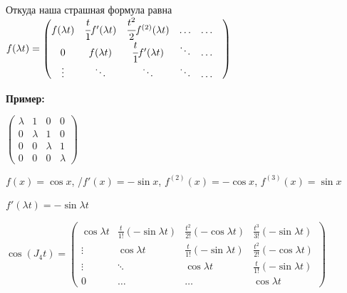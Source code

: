 Откуда наша страшная формула равна $f(\lambda t) = \begin{pmatrix}
    f(\lambda t) & \cfrac{t}{1}f'(\lambda t) & \cfrac{t^2}{2}f^{(2)}(\lambda t) & \ldots & \ldots & \\
    0 & f(\lambda t) & \cfrac{t}{1}f'(\lambda t) &\ddots &\ldots 
    \\
    \vdots & \ddots & \ddots & \ddots& \ldots
\end{pmatrix}$


\textbf{Пример:}


$\begin{pmatrix}
    \lambda & 1 & 0 & 0 \\
    0 & \lambda & 1 & 0\\
    0 & 0 & \lambda & 1\\
    0 & 0 & 0 & \lambda
\end{pmatrix}$

$f(x)=\cos x$, /$f'{(x)} = - \sin x$, $f^{(2)}{(x)} = - \cos x$, $f^{(3)}{(x)} =  \sin x$

$f'(\lambda t)=- \sin \lambda t$

$\cos (J_4t) = \begin{pmatrix}
    \cos \lambda t & \frac{t}{1!}(-\sin \lambda t) &\frac{t^2}{2!}(-\cos \lambda t) & \frac{t^3}{3!}(-\sin \lambda t)\\
    \vdots & \cos \lambda t & \frac{t}{1!}(-\sin \lambda t) &\frac{t^2}{2!}(-\cos \lambda t) \\
    \vdots & \ddots & \cos \lambda t & \frac{t}{1!}(-\sin \lambda t) \\
    0 & \ldots & \ldots & \cos \lambda t
\end{pmatrix}$






